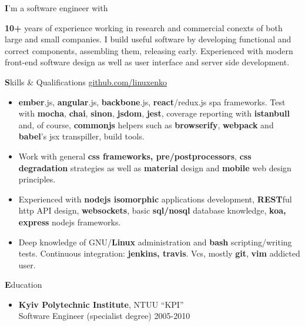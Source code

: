 \documentclass[a4paper,12pt]{article}
\begin{document}
\textbf{I}'m a software engineer with {\textbf {\small{10+}} years of experience working in research and commercial
conexts of both large and small companies. I build useful software by developing functional and correct
components, assembling them, releasing early. Experienced with modern front-end software design as well as
user interface and server side development.  \\\bigskip

%
%

{\large \textbf{S}kills \& Qualifications} \hfill \href{https://github.com/linuxenko}{github.com/linuxenko}

\begin{itemize}[itemsep=-2pt]
  \item \textbf{ember}.js, \textbf{angular}.js, \textbf{backbone}.js, \textbf{react}/redux.js spa frameworks.
    Test with \textbf{mocha}, \textbf{chai}, \textbf{sinon}, \textbf{jsdom}, \textbf{jest}, coverage reporting with \textbf{istanbull} and, of course,
    \textbf{commonjs} helpers such as \textbf{browserify}, \textbf{webpack} and \textbf{babel}'s jsx transpiller, build tools.

  \item Work with general \textbf{css frameworks, pre/postprocessors},  \textbf{css degradation} strategies as
    well as \textbf{material} design and \textbf{mobile} web design principles.

  \item Experienced with \textbf{nodejs isomorphic} applications development, \textbf{REST}ful http API design, \textbf{websockets},
    basic \textbf{sql/nosql} database knowledge, \textbf{koa, express} nodejs frameworks.

  \item Deep knowledge of GNU/\textbf{Linux} administration and \textbf{bash} scripting/writing tests. Continuous integration: \textbf{jenkins, travis}. Vcs, mostly \textbf{git}, \textbf{vim} addicted user.

\end{itemize}

%
%

{\large \textbf{E}ducation}

\begin{itemize}[itemsep=-2pt]
  \item \textbf{Kyiv Polytechnic Institute}, NTUU ``KPI'' \\
  Software Engineer (specialist degree) \hfill 2005-2010
\end{itemize}

}
\end{document}
